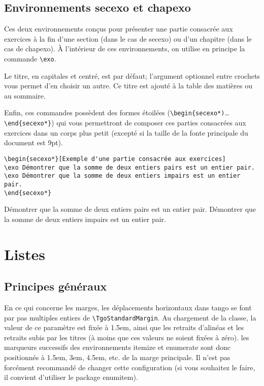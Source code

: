 \documentclass[french,ColorTheme=USAF,FontSize=10pt]{tango}
\newcommand\TO[1]{\textsf{#1}}
\begin{document}
\subsection{Environnements secexo et chapexo}
Ces deux environnements conçus pour présenter une partie consacrée aux exercices à la fin d'une section (dans le cas de \TO{secexo}) ou d'un chapitre (dans le cas de \TO{chapexo}). À l'intérieur de ces environnements, on utilise en principe la commande \verb+\exo+.

Le titre, en capitales et centré, est  par défaut; l'argument optionnel entre crochets vous permet d'en choisir un autre. Ce titre est ajouté à la table des matières ou au sommaire.

Enfin, ces commandes possèdent des formes étoilées (\verb+\begin{secexo*)+…\verb+\end{secexo*}+) qui vous permettront de composer ces parties consacrées aux exercices dans un corps plus petit (excepté si la taille de la fonte principale du document est 9pt). 

\begin{tcolorbox}
\begin{verbatim}
\begin{secexo*}[Exemple d'une partie consacrée aux exercices]
\exo Démontrer que la somme de deux entiers pairs est un entier pair.
\exo Démontrer que la somme de deux entiers impairs est un entier pair.
\end{secexo*}
\end{verbatim}
\end{tcolorbox}
\begin{secexo*}
\exo Démontrer que la somme de deux entiers pairs est un entier pair.
\exo Démontrer que la somme de deux entiers impairs est un entier pair.
\end{secexo*}

\section{Listes}\label{lists}
\subsection{Principes généraux}
En ce qui concerne les marges, les déplacements horizontaux dans tango se font par pas multiples entiers de \verb+\TgoStandardMargin+. Au chargement de la classe, la valeur de ce paramètre est fixée à 1.5em, ainsi que les retraits d'alinéas et les retraits subis par les titres (à moins que ces valeurs ne soient fixées à zéro). les marqueurs successifs des environnements itemize et enumerate sont donc positionnés à 1.5em, 3em, 4.5em, etc. de la marge principale. Il n'est pas forcément recommandé de changer cette configuration (si vous souhaitez le faire, il convient d'utiliser le package \TO{enumitem}).
\end{document}
